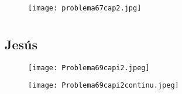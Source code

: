 \documentclass[12pt]{article}
\begin{document}
\begin{figure}[htb] 
\centering \texttt{[image: problema67cap2.jpg]} 
\end{figure}
\newpage

\section{ }
\subsection{{} Jesús}

\begin{figure}[htb] 
\centering \texttt{[image: Problema69capi2.jpeg]} 
\end{figure}
\newpage

\begin{figure}[htb] 
\centering \texttt{[image: Problema69capi2continu.jpeg]} 
\end{figure}
\newpage
\end{document}

